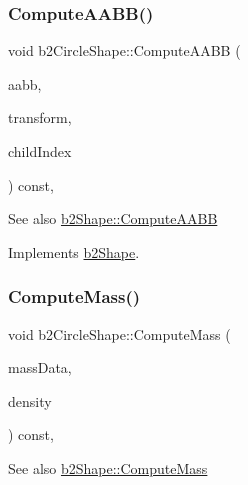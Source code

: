 \subsubsection{\texorpdfstring{Compute\+A\+A\+B\+B()}{ComputeAABB()}\hspace{0.1cm}{\footnotesize\ttfamily [2/2]}}
{\footnotesize\ttfamily void b2\+Circle\+Shape\+::\+Compute\+A\+A\+BB (\begin{DoxyParamCaption}\item[{\hyperlink{structb2AABB}{b2\+A\+A\+BB} $\ast$}]{aabb,  }\item[{const \hyperlink{structb2Transform}{b2\+Transform} \&}]{transform,  }\item[{int32}]{child\+Index }\end{DoxyParamCaption}) const\hspace{0.3cm}{\ttfamily [override]}, {\ttfamily [virtual]}}

\begin{DoxySeeAlso}{See also}
\hyperlink{classb2Shape_a88e9807fab0c8ca9a98d8926e50a1411}{b2\+Shape\+::\+Compute\+A\+A\+BB} 
\end{DoxySeeAlso}


Implements \hyperlink{classb2Shape_a88e9807fab0c8ca9a98d8926e50a1411}{b2\+Shape}.

\mbox{\label{classb2CircleShape_a7dc07891abd015863fbf03076e47eec5}} 
\subsubsection{\texorpdfstring{Compute\+Mass()}{ComputeMass()}\hspace{0.1cm}{\footnotesize\ttfamily [1/2]}}
{\footnotesize\ttfamily void b2\+Circle\+Shape\+::\+Compute\+Mass (\begin{DoxyParamCaption}\item[{\hyperlink{structb2MassData}{b2\+Mass\+Data} $\ast$}]{mass\+Data,  }\item[{float32}]{density }\end{DoxyParamCaption}) const\hspace{0.3cm}{\ttfamily [override]}, {\ttfamily [virtual]}}

\begin{DoxySeeAlso}{See also}
\hyperlink{classb2Shape_a61b365526241b47f124789b0309cac69}{b2\+Shape\+::\+Compute\+Mass} 
\end{DoxySeeAlso}


